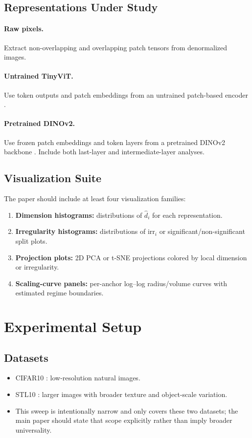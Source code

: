 \documentclass{article}
\newcommand{\dataset}[1]{\textsc{#1}}
\newcommand{\dimhat}{\widehat{d}}
\newcommand{\irr}{\mathrm{irr}}
\theoremstyle{definition}
\theoremstyle{plain}
\theoremstyle{remark}
\begin{document}
\subsection{Representations Under Study}
\paragraph{Raw pixels.}
Extract non-overlapping and overlapping patch tensors from denormalized images.

\paragraph{Untrained TinyViT.}
Use token outputs and patch embeddings from an untrained patch-based encoder \citep{wu2022tinyvit}.

\paragraph{Pretrained DINOv2.}
Use frozen patch embeddings and token layers from a pretrained DINOv2 backbone \citep{oquab2023dinov2}. Include both last-layer and intermediate-layer analyses.

\subsection{Visualization Suite}
The paper should include at least four visualization families:
\begin{enumerate}[leftmargin=1.5em]
\item \textbf{Dimension histograms:} distributions of $\dimhat_i$ for each representation.
\item \textbf{Irregularity histograms:} distributions of $\irr_i$ or significant/non-significant split plots.
\item \textbf{Projection plots:} 2D PCA or t-SNE projections colored by local dimension or irregularity.
\item \textbf{Scaling-curve panels:} per-anchor log--log radius/volume curves with estimated regime boundaries.
\end{enumerate}

\section{Experimental Setup}
\label{sec:experimental-setup}

\subsection{Datasets}
\begin{itemize}[leftmargin=1.5em]
\item \dataset{CIFAR10} \citep{krizhevsky2009learning}: low-resolution natural images.
\item \dataset{STL10} \citep{coates2011analysis}: larger images with broader texture and object-scale variation.
\item This sweep is intentionally narrow and only covers these two datasets; the main paper should state that scope explicitly rather than imply broader universality.
\end{itemize}
\end{document}
